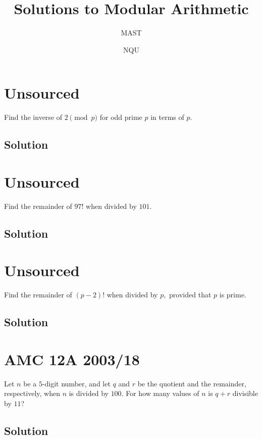 \documentclass[mast]{lucky}
\title{Solutions to Modular Arithmetic}
\author{MAST}
\date{NQU}
\begin{document}
\maketitle

\toc

\pagebreak\section{Unsourced}

Find the inverse of $2\pmod {p}$ for odd prime $p$ in terms of $p.$

\subsection{Solution}

\pagebreak\section{Unsourced}

Find the remainder of $97!$ when divided by $101.$

\subsection{Solution}

\pagebreak\section{Unsourced}

Find the remainder of $(p-2)!$ when divided by $p,$ provided that $p$ is prime.

\subsection{Solution}

\pagebreak\section{AMC 12A 2003/18}

Let $n$ be a $5$-digit number, and let $q$ and $r$ be the quotient and the remainder, respectively, when $n$ is divided by $100$. For how many values of $n$ is $q+r$ divisible by $11$?

\subsection{Solution}
\end{document}
